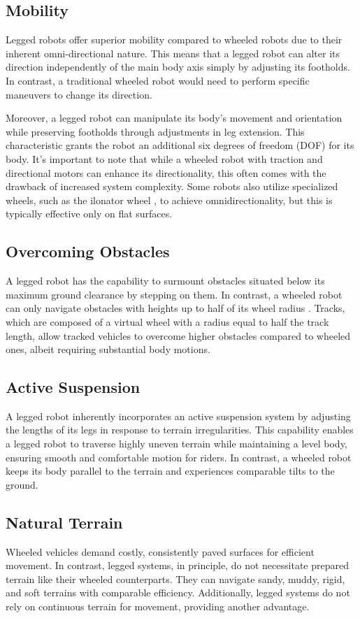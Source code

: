 \subsection{Mobility}
Legged robots offer superior mobility compared to wheeled robots due to their inherent omni-directional nature. This means that a legged robot can alter its direction independently of the main body axis simply by adjusting its footholds. In contrast, a traditional wheeled robot would need to perform specific maneuvers to change its direction.

Moreover, a legged robot can manipulate its body's movement and orientation while preserving footholds through adjustments in leg extension. This characteristic grants the robot an additional six degrees of freedom (DOF) for its body. It's important to note that while a wheeled robot with traction and directional motors can enhance its directionality, this often comes with the drawback of increased system complexity. Some robots also utilize specialized wheels, such as the ilonator wheel \cite{omniwheel}, to achieve omnidirectionality, but this is typically effective only on flat surfaces.

\subsection{Overcoming Obstacles}
A legged robot has the capability to surmount obstacles situated below its maximum ground clearance by stepping on them. In contrast, a wheeled robot can only navigate obstacles with heights up to half of its wheel radius \cite{mckerrow}. Tracks, which are composed of a virtual wheel with a radius equal to half the track length, allow tracked vehicles to overcome higher obstacles compared to wheeled ones, albeit requiring substantial body motions.

\subsection{Active Suspension}
A legged robot inherently incorporates an active suspension system by adjusting the lengths of its legs in response to terrain irregularities. This capability enables a legged robot to traverse highly uneven terrain while maintaining a level body, ensuring smooth and comfortable motion for riders. In contrast, a wheeled robot keeps its body parallel to the terrain and experiences comparable tilts to the ground.

\subsection{Natural Terrain}
Wheeled vehicles demand costly, consistently paved surfaces for efficient movement. In contrast, legged systems, in principle, do not necessitate prepared terrain like their wheeled counterparts. They can navigate sandy, muddy, rigid, and soft terrains with comparable efficiency. Additionally, legged systems do not rely on continuous terrain for movement, providing another advantage.


